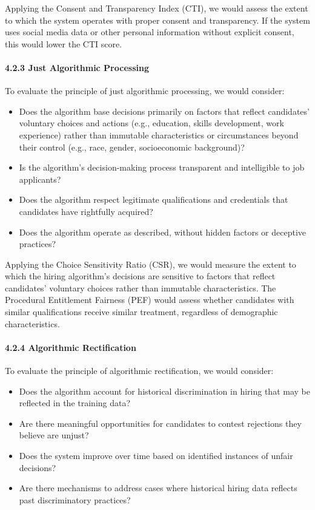 Applying the Consent and Transparency Index (CTI), we would assess the
extent to which the system operates with proper consent and
transparency. If the system uses social media data or other personal
information without explicit consent, this would lower the CTI score.

\paragraph{4.2.3 Just Algorithmic
Processing}\label{just-algorithmic-processing-1}

To evaluate the principle of just algorithmic processing, we would
consider:

\begin{itemize}
\tightlist
\item
  Does the algorithm base decisions primarily on factors that reflect
  candidates' voluntary choices and actions (e.g., education, skills
  development, work experience) rather than immutable characteristics or
  circumstances beyond their control (e.g., race, gender, socioeconomic
  background)?
\item
  Is the algorithm's decision-making process transparent and
  intelligible to job applicants?
\item
  Does the algorithm respect legitimate qualifications and credentials
  that candidates have rightfully acquired?
\item
  Does the algorithm operate as described, without hidden factors or
  deceptive practices?
\end{itemize}

Applying the Choice Sensitivity Ratio (CSR), we would measure the extent
to which the hiring algorithm's decisions are sensitive to factors that
reflect candidates' voluntary choices rather than immutable
characteristics. The Procedural Entitlement Fairness (PEF) would assess
whether candidates with similar qualifications receive similar
treatment, regardless of demographic characteristics.

\paragraph{4.2.4 Algorithmic
Rectification}\label{algorithmic-rectification-1}

To evaluate the principle of algorithmic rectification, we would
consider:

\begin{itemize}
\tightlist
\item
  Does the algorithm account for historical discrimination in hiring
  that may be reflected in the training data?
\item
  Are there meaningful opportunities for candidates to contest
  rejections they believe are unjust?
\item
  Does the system improve over time based on identified instances of
  unfair decisions?
\item
  Are there mechanisms to address cases where historical hiring data
  reflects past discriminatory practices?
\end{itemize}

